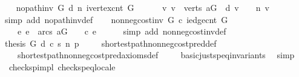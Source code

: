 \begin{isabellebody}
\ \ \isamarkupfalse%
\ {\isachardoublequoteopen}no{\isacharunderscore}path{\isacharunderscore}inv\ G\ d\ n\ {\isacharparenleft}ivertex{\isacharunderscore}cnt\ G{\isacharparenright}\ {\isasymlongleftrightarrow}\ \isanewline
\ \ \ \ {\isacharparenleft}{\isasymforall}v{\isachardot}\ v\ {\isasymin}\ verts\ {\isacharquery}aG\ {\isasymlongrightarrow}\ {\isacharparenleft}d\ v\ {\isacharequal}\ {\isasyminfinity}{\isacharparenright}\ {\isacharequal}\ {\isacharparenleft}n\ v\ {\isacharequal}\ {\isasyminfinity}{\isacharparenright}{\isacharparenright}{\isachardoublequoteclose}\isanewline
\ \ \ \ \isamarkupfalse%
\ {\isacharparenleft}simp\ add{\isacharcolon}\ no{\isacharunderscore}path{\isacharunderscore}inv{\isacharunderscore}def{\isacharparenright}\isanewline
{}\isamarkupfalse%
\isanewline
\ \ \isamarkupfalse%
\ {\isachardoublequoteopen}non{\isacharunderscore}neg{\isacharunderscore}cost{\isacharunderscore}inv\ G\ c\ {\isacharparenleft}iedge{\isacharunderscore}cnt\ G{\isacharparenright}\ {\isasymlongleftrightarrow}\ \isanewline
\ \ \ \ {\isacharparenleft}{\isasymforall}e{\isachardot}\ e\ {\isasymin}\ arcs\ {\isacharquery}aG\ {\isasymlongrightarrow}\ {}\ {\isasymle}\ c\ e{\isacharparenright}{\isachardoublequoteclose}\isanewline
\ \ \ \ \isamarkupfalse%
\ {\isacharparenleft}simp\ add{\isacharcolon}\ non{\isacharunderscore}neg{\isacharunderscore}cost{\isacharunderscore}inv{\isacharunderscore}def{\isacharparenright}\isanewline
{}\isamarkupfalse%
\isanewline
\ \ \ \isamarkupfalse%
\ {\isachardoublequoteopen}{\isacharquery}thesis\ G\ d\ c\ s\ n\ p{\isachardoublequoteclose}\isanewline
\ \ \ \isamarkupfalse%
\ shortest{\isacharunderscore}path{\isacharunderscore}non{\isacharunderscore}neg{\isacharunderscore}cost{\isacharunderscore}pred{\isacharunderscore}def\ \isanewline
\ \ \ \ shortest{\isacharunderscore}path{\isacharunderscore}non{\isacharunderscore}neg{\isacharunderscore}cost{\isacharunderscore}pred{\isacharunderscore}axioms{\isacharunderscore}def\isanewline
\ \ \ \isamarkupfalse%
\ basic{\isacharunderscore}just{\isacharunderscore}sp{\isacharunderscore}eq{\isacharunderscore}invariants\ \isamarkupfalse%
\ simp\isanewline
{}\isamarkupfalse%
%
\endisatagproof
{\isafoldproof}%
%
\isadelimproof
\isanewline
%
\endisadelimproof
\isanewline
{}\isamarkupfalse%
\ {\isacharparenleft}\ check{\isacharunderscore}sp{\isacharunderscore}impl{\isacharparenright}\ check{\isacharunderscore}sp{\isacharunderscore}eq{\isacharunderscore}locale{\isacharcolon}\isanewline

\end{isabellebody}
